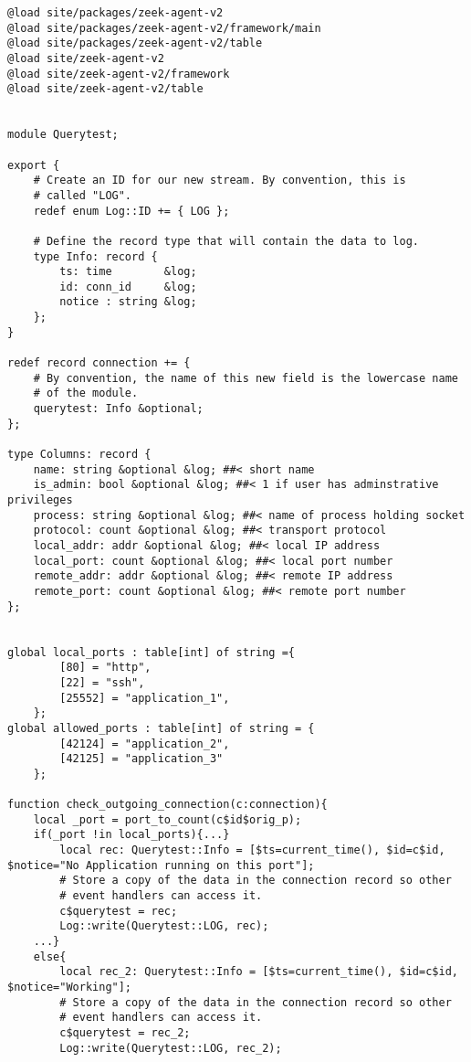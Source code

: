 \begin{lstlisting}[firstline=52,lastline=77,firstnumber=52,linerange={52-54,70-77}]
@load site/packages/zeek-agent-v2
@load site/packages/zeek-agent-v2/framework/main
@load site/packages/zeek-agent-v2/table
@load site/zeek-agent-v2
@load site/zeek-agent-v2/framework
@load site/zeek-agent-v2/table


module Querytest;

export {
    # Create an ID for our new stream. By convention, this is
    # called "LOG".
    redef enum Log::ID += { LOG };

    # Define the record type that will contain the data to log.
    type Info: record {
        ts: time        &log;
        id: conn_id     &log; 
        notice : string &log;
    };
}

redef record connection += {
    # By convention, the name of this new field is the lowercase name
    # of the module.
    querytest: Info &optional;
};

type Columns: record {
    name: string &optional &log; ##< short name
    is_admin: bool &optional &log; ##< 1 if user has adminstrative privileges
    process: string &optional &log; ##< name of process holding socket
    protocol: count &optional &log; ##< transport protocol
    local_addr: addr &optional &log; ##< local IP address
    local_port: count &optional &log; ##< local port number
    remote_addr: addr &optional &log; ##< remote IP address
    remote_port: count &optional &log; ##< remote port number
};


global local_ports : table[int] of string ={
        [80] = "http",
        [22] = "ssh",
        [25552] = "application_1",
    };
global allowed_ports : table[int] of string = {
        [42124] = "application_2",
        [42125] = "application_3" 
    };

function check_outgoing_connection(c:connection){
    local _port = port_to_count(c$id$orig_p);
    if(_port !in local_ports){...}
        local rec: Querytest::Info = [$ts=current_time(), $id=c$id, $notice="No Application running on this port"];
        # Store a copy of the data in the connection record so other
        # event handlers can access it.
        c$querytest = rec;
        Log::write(Querytest::LOG, rec);
    ...}
    else{
        local rec_2: Querytest::Info = [$ts=current_time(), $id=c$id, $notice="Working"];
        # Store a copy of the data in the connection record so other
        # event handlers can access it.
        c$querytest = rec_2;
        Log::write(Querytest::LOG, rec_2);
    

\end{lstlisting}
